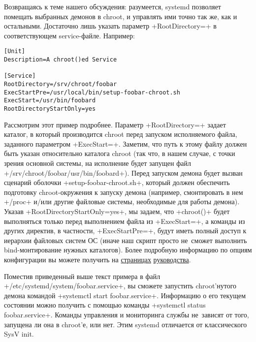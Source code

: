 \documentclass[10pt,oneside,a4paper]{article}
\begin{document}
Возвращаясь к теме нашего обсуждения: разумеется, systemd позволяет помещать
выбранных демонов в chroot, и управлять ими точно так же, как и остальными.
Достаточно лишь указать параметр +RootDirectory=+ в соответствующем
service-файле. Например:
\begin{Verbatim}
[Unit]
Description=A chroot()ed Service

[Service]
RootDirectory=/srv/chroot/foobar
ExecStartPre=/usr/local/bin/setup-foobar-chroot.sh
ExecStart=/usr/bin/foobard
RootDirectoryStartOnly=yes
\end{Verbatim}

Рассмотрим этот пример подробнее. Параметр +RootDirectory=+ задает каталог, в
который производится chroot перед запуском исполняемого файла, заданного
параметром +ExecStart=+. Заметим, что путь к этому файлу должен быть указан
относительно каталога chroot (так что, в нашем случае, с точки зрения основной
системы, на исполнение будет запущен файл +/srv/chroot/foobar/usr/bin/foobard+).
Перед запуском демона будет вызван сценарий оболочки +setup-foobar-chroot.sh+,
который должен обеспечить подготовку chroot-окружения к запуску демона
(например, смонтировать в нем +/proc+ и/или другие файловые системы, необходимые
для работы демона). Указав +RootDirectoryStartOnly=yes+, мы задаем, что
+chroot()+ будет выполняться только перед выполнением файла из +ExecStart=+, а
команды из других директив, в частности, +ExecStartPre=+, будут иметь полный
доступ к иерархии файловых систем ОС (иначе наш скрипт просто не~сможет
выполнить bind-монтирование нужных каталогов). Более подробную информацию по
опциям конфигурации вы можете получить на
\href{http://www.freedesktop.org/software/systemd/man/systemd.service.html}{страницах}
\href{http://www.freedesktop.org/software/systemd/man/systemd.exec.html}{руководства}.

Поместив приведенный выше текст примера в файл
+/etc/systemd/system/foobar.service+, вы сможете запустить chroot'нутого демона
командой +systemctl start foobar.service+. Информацию о его текущем состоянии
можно получить с помощью команды +systemctl status foobar.service+. Команды
управления и мониторинга службы не~зависят от того, запущена ли она в chroot'е,
или нет. Этим systemd отличается от классического SysV init.
\end{document}
